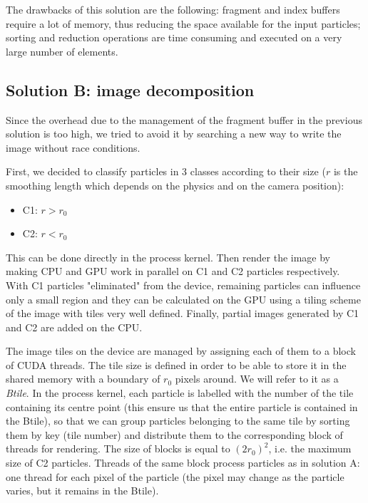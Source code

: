 \documentclass[11pt]{article}
\begin{document}
\normalsize
The drawbacks of this solution are the following: fragment and index buffers require a lot of memory, thus reducing the space available for the input particles; sorting and reduction operations are time consuming and executed on a very large number of elements. 


\subsection{Solution B: image decomposition}

Since the overhead due to the management of the fragment buffer in the previous solution is too high, we tried to avoid it by searching a new way to write the image without race conditions. 

First, we decided to classify particles in 3 classes according to their size ($r$ is the smoothing length which depends on the physics and on the camera position):
\begin{itemize}
\item 
C1: $r > r_0$
\item
C2: $r < r_0$
\end{itemize}
This can be done directly in the process kernel. Then render the image by making CPU and GPU work in parallel on C1 and C2 particles respectively. With C1 particles "eliminated" from the device, remaining particles can influence only a small region and they can be calculated on the GPU using a tiling scheme of the image with tiles very well defined. Finally, partial images generated by C1 and C2 are added on the CPU.

The image tiles on the device are managed by assigning each of them to a block of CUDA threads. The tile size is defined in order to be able to store it in the shared memory with a boundary of $r_0$ pixels around. We will refer to it as a \textit{Btile}. In the process kernel, each particle is labelled with the number of the tile containing its centre point (this ensure us that the entire particle is contained in the Btile), so that we can group particles belonging to the same tile by sorting them by key (tile number) and distribute them to the corresponding block of threads for rendering. The size of blocks is equal to $(2r_0)^2$, i.e. the maximum size of C2 particles. Threads of the same block process particles as in solution A: one thread for each pixel of the particle (the pixel may change as the particle varies, but it remains in the Btile).
   
\end{document}
